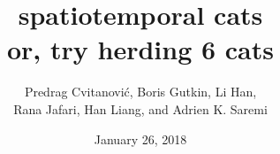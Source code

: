 


\title{ 			spatiotemporal cats
       \\ \Huge 	or, try herding 6 cats
        \\\vspace{1.0cm}
        }\author{
        Predrag Cvitanovi\'{c},
        Boris Gutkin,
        Li Han,
    \\
        Rana Jafari,
        Han Liang,
         and
		Adrien K. Saremi
        }

        \date{January 26, 2018} \Private{\date{\today}}
